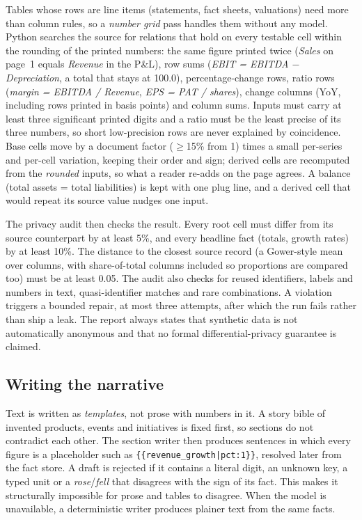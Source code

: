 \documentclass[10pt,twocolumn]{article}
\begin{document}
Tables whose rows are line items (statements, fact sheets, valuations) need more than column
rules, so a \emph{number grid} pass handles them without any model. Python searches the source for
relations that hold on every testable cell within the rounding of the printed numbers: the same
figure printed twice (\textit{Sales} on page~1 equals \textit{Revenue} in the P\&L), row sums
(\textit{EBIT = EBITDA $-$ Depreciation}, a total that stays at 100.0), percentage-change rows,
ratio rows (\textit{margin = EBITDA / Revenue}, \textit{EPS = PAT / shares}), change columns (YoY,
including rows printed in basis points) and column sums. Inputs must carry at least three
significant printed digits and a ratio must be the least precise of its three numbers, so short
low-precision rows are never explained by coincidence. Base cells move by a document factor
($\ge$15\% from 1) times a small per-series and per-cell variation, keeping their order and sign;
derived cells are recomputed from the \emph{rounded} inputs, so what a reader re-adds on the page
agrees. A balance (total assets = total liabilities) is kept with one plug line, and a derived cell
that would repeat its source value nudges one input.

The privacy audit then checks the result. Every root cell must differ from its source counterpart
by at least 5\%, and every headline fact (totals, growth rates) by at least 10\%. The distance to the
closest source record (a Gower-style mean over columns, with share-of-total columns included so
proportions are compared too) must be at least 0.05. The audit also checks for reused
identifiers, labels and numbers in text, quasi-identifier matches and rare combinations. A
violation triggers a bounded repair, at most three attempts, after which the run fails rather than
ship a leak. The report always states that synthetic data is not automatically anonymous and that
no formal differential-privacy guarantee is claimed.

\subsection{Writing the narrative}
Text is written as \emph{templates}, not prose with numbers in it. A story bible of invented
products, events and initiatives is fixed first, so sections do not contradict each other. The
section writer then produces sentences in which every figure is a placeholder such as
\texttt{\{\{revenue\_growth|pct:1\}\}}, resolved later from the fact store. A draft is rejected if it
contains a literal digit, an unknown key, a typed unit or a \textit{rose}/\textit{fell} that
disagrees with the sign of its fact. This makes it structurally impossible for prose and tables to
disagree. When the model is unavailable, a deterministic writer produces plainer text from the
same facts.
\end{document}
